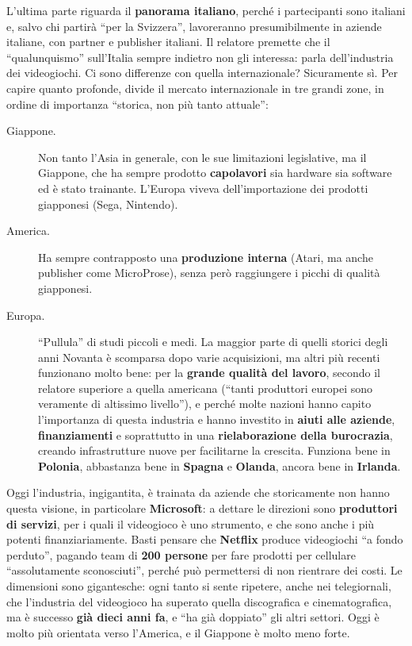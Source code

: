 L'ultima parte riguarda il \textbf{panorama italiano}, perché i partecipanti sono
italiani e, salvo chi partirà ``per la Svizzera'', lavoreranno presumibilmente in
aziende italiane, con partner e publisher italiani. Il relatore premette che il
``qualunquismo'' sull'Italia sempre indietro non gli interessa: parla
dell'industria dei videogiochi. Ci sono differenze con quella internazionale?
Sicuramente sì. Per capire quanto profonde, divide il mercato internazionale in
tre grandi zone, in ordine di importanza ``storica, non più tanto attuale'':
\begin{description}
  \item[Giappone.] Non tanto l'Asia in generale, con le sue limitazioni
        legislative, ma il Giappone, che ha sempre prodotto \textbf{capolavori}
        sia hardware sia software ed è stato trainante. L'Europa viveva
        dell'importazione dei prodotti giapponesi (Sega, Nintendo).
  \item[America.] Ha sempre contrapposto una \textbf{produzione interna}
        (Atari, ma anche publisher come MicroProse), senza però raggiungere i
        picchi di qualità giapponesi.
  \item[Europa.] ``Pullula'' di studi piccoli e medi. La maggior parte di quelli
        storici degli anni Novanta è scomparsa dopo varie acquisizioni, ma altri
        più recenti funzionano molto bene: per la \textbf{grande qualità del
        lavoro}, secondo il relatore superiore a quella americana (``tanti
        produttori europei sono veramente di altissimo livello''), e perché
        molte nazioni hanno capito l'importanza di questa industria e hanno
        investito in \textbf{aiuti alle aziende}, \textbf{finanziamenti} e
        soprattutto in una \textbf{rielaborazione della burocrazia}, creando
        infrastrutture nuove per facilitarne la crescita. Funziona bene in
        \textbf{Polonia}, abbastanza bene in \textbf{Spagna} e
        \textbf{Olanda}, ancora bene in \textbf{Irlanda}.
\end{description}

Oggi l'industria, ingigantita, è trainata da aziende che storicamente non hanno
questa visione, in particolare \textbf{Microsoft}: a dettare le direzioni sono
\textbf{produttori di servizi}, per i quali il videogioco è uno strumento, e
che sono anche i più potenti finanziariamente. Basti pensare che
\textbf{Netflix} produce videogiochi ``a fondo perduto'', pagando team di
\textbf{200 persone} per fare prodotti per cellulare ``assolutamente
sconosciuti'', perché può permettersi di non rientrare dei costi. Le dimensioni
sono gigantesche: ogni tanto si sente ripetere, anche nei telegiornali, che
l'industria del videogioco ha superato quella discografica e cinematografica,
ma è successo \textbf{già dieci anni fa}, e ``ha già doppiato'' gli altri
settori. Oggi è molto più orientata verso l'America, e il Giappone è molto meno
forte.

